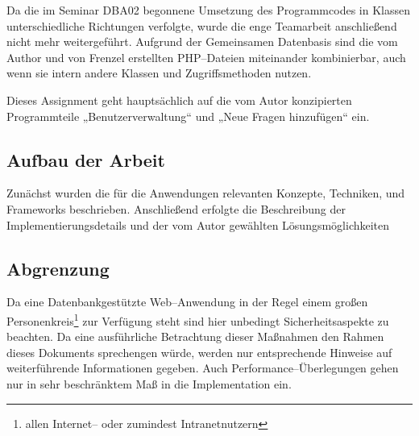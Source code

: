 Da die im Seminar DBA02 begonnene Umsetzung des Programmcodes in Klassen unterschiedliche Richtungen verfolgte, wurde die enge Teamarbeit anschließend nicht mehr weitergeführt. Aufgrund der Gemeinsamen Datenbasis sind die vom Author und von Frenzel erstellten PHP--Dateien miteinander kombinierbar, auch wenn sie intern andere Klassen und Zugriffsmethoden nutzen.

Dieses Assignment geht hauptsächlich auf die vom Autor konzipierten Programmteile „Benutzerverwaltung“ und „Neue Fragen hinzufügen“ ein.

\subsection{Aufbau der Arbeit}

Zunächst wurden die für die Anwendungen relevanten Konzepte, Techniken, und Frameworks beschrieben. Anschließend erfolgte die Beschreibung der Implementierungsdetails und der vom Autor gewählten Lösungsmöglichkeiten  

\subsection{Abgrenzung}

Da eine Datenbankgestützte Web--Anwendung in der Regel einem großen Personenkreis\footnote{allen Internet-- oder zumindest Intranetnutzern} zur Verfügung steht sind hier unbedingt Sicherheitsaspekte zu beachten. Da eine ausführliche Betrachtung dieser Maßnahmen den Rahmen dieses Dokuments sprechengen würde, werden nur entsprechende Hinweise auf weiterführende Informationen gegeben. Auch Performance--Überlegungen gehen nur in sehr beschränktem Maß in die Implementation ein.

